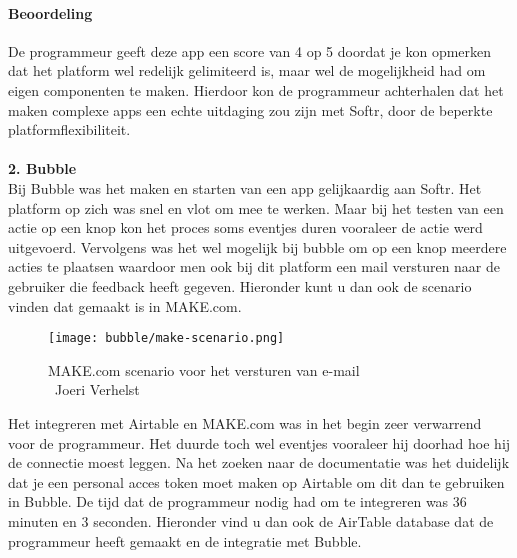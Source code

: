 \paragraph*{Beoordeling}
De programmeur geeft deze app een score van 4 op 5 doordat je kon opmerken dat het platform wel redelijk gelimiteerd is, maar wel de mogelijkheid had om eigen componenten te maken. 
Hierdoor kon de programmeur achterhalen dat het maken complexe apps een echte uitdaging zou zijn met Softr, 
door de beperkte platformflexibiliteit.
\\
\\
\textbf{2. Bubble}
\\
Bij Bubble was het maken en starten van een app gelijkaardig aan Softr. Het platform op zich was snel en vlot om mee te werken. Maar bij het testen van een actie op een knop
kon het proces soms eventjes duren vooraleer de actie werd uitgevoerd. Vervolgens was het wel mogelijk bij bubble om op een knop meerdere acties te plaatsen waardoor men ook 
bij dit platform een mail versturen naar de gebruiker die feedback heeft gegeven. Hieronder kunt u dan ook de scenario vinden dat gemaakt is in MAKE.com.
\\
\begin{figure}[H]
    \texttt{[image: bubble/make-scenario.png]}
    \caption[MAKE.com scenario voor het versturen van e-mail]{MAKE.com scenario voor het versturen van e-mail\\\textcopyright\ Joeri Verhelst}
    \label{fig:make-scenario-bubble}
\end{figure}
Het integreren met Airtable en MAKE.com was in het begin zeer verwarrend voor de programmeur. Het duurde toch wel eventjes vooraleer hij doorhad hoe hij de connectie moest leggen.
Na het zoeken naar de documentatie was het duidelijk dat je een personal acces token moet maken op Airtable om dit dan te gebruiken in Bubble. De tijd dat de programmeur nodig had 
om te integreren was 36 minuten en 3 seconden. Hieronder vind u dan ook de AirTable database dat de programmeur heeft gemaakt en de integratie met Bubble.
\\
\\


